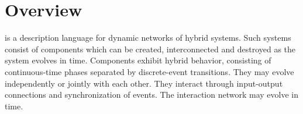 


% 
% 

\section{Overview\label{overview}} \todaysname{} is a description
language for dynamic
networks of hybrid systems.  Such systems consist of components which
can be created, interconnected and destroyed as the system evolves in
time.  Components exhibit hybrid behavior, consisting of
continuous-time phases separated by discrete-event transitions.  They
may evolve independently or jointly with each other.  They interact
through input-output connections and synchronization of events.  The
interaction network may evolve in time.

